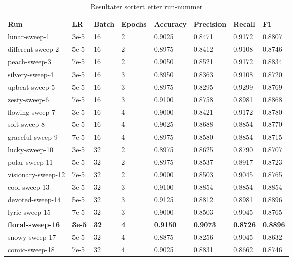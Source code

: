 \begin{table}
\caption{Resultater sortert etter run-nummer}
\label{tab:results}
\begin{tabular}{llllllll}
\toprule
Run & LR & Batch & Epochs & Accuracy & Precision & Recall & F1 \\
\midrule
lunar-sweep-1 & 3e-5 & 16 & 2 & 0.9025 & 0.8471 & 0.9172 & 0.8807 \\
different-sweep-2 & 5e-5 & 16 & 2 & 0.8975 & 0.8412 & 0.9108 & 0.8746 \\
peach-sweep-3 & 7e-5 & 16 & 2 & 0.9050 & 0.8521 & 0.9172 & 0.8834 \\
silvery-sweep-4 & 3e-5 & 16 & 3 & 0.8950 & 0.8363 & 0.9108 & 0.8720 \\
upbeat-sweep-5 & 5e-5 & 16 & 3 & 0.8975 & 0.8295 & 0.9299 & 0.8769 \\
zesty-sweep-6 & 7e-5 & 16 & 3 & 0.9100 & 0.8758 & 0.8981 & 0.8868 \\
flowing-sweep-7 & 3e-5 & 16 & 4 & 0.9000 & 0.8421 & 0.9172 & 0.8780 \\
soft-sweep-8 & 5e-5 & 16 & 4 & 0.9025 & 0.8688 & 0.8854 & 0.8770 \\
graceful-sweep-9 & 7e-5 & 16 & 4 & 0.8975 & 0.8580 & 0.8854 & 0.8715 \\
lucky-sweep-10 & 3e-5 & 32 & 2 & 0.8975 & 0.8625 & 0.8790 & 0.8707 \\
polar-sweep-11 & 5e-5 & 32 & 2 & 0.8975 & 0.8537 & 0.8917 & 0.8723 \\
visionary-sweep-12 & 7e-5 & 32 & 2 & 0.9000 & 0.8503 & 0.9045 & 0.8765 \\
cool-sweep-13 & 3e-5 & 32 & 3 & 0.9100 & 0.8854 & 0.8854 & 0.8854 \\
devoted-sweep-14 & 5e-5 & 32 & 3 & 0.9125 & 0.8812 & 0.8981 & 0.8896 \\
lyric-sweep-15 & 7e-5 & 32 & 3 & 0.9000 & 0.8503 & 0.9045 & 0.8765 \\
\textbf{floral-sweep-16} & \textbf{3e-5} & \textbf{32} & \textbf{4} & \textbf{0.9150} & \textbf{0.9073} & \textbf{0.8726} & \textbf{0.8896} \\
snowy-sweep-17 & 5e-5 & 32 & 4 & 0.8875 & 0.8256 & 0.9045 & 0.8632 \\
comic-sweep-18 & 7e-5 & 32 & 4 & 0.9025 & 0.8831 & 0.8662 & 0.8746 \\
\bottomrule
\end{tabular}
\end{table}
